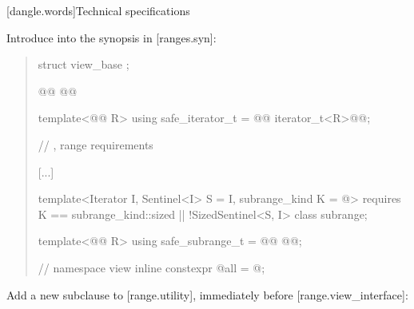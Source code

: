 [dangle.words]{Technical specifications}

Introduce  into the  synopsis in
[ranges.syn]:
\begin{quote}
\begin{codeblock}
    struct view_base { };

    @@
    @@

    template<@@ R>
      using safe_iterator_t =
        @@ iterator_t<R>@@;

    // , range requirements

    [...]

    template<Iterator I, Sentinel<I> S = I, subrange_kind K = @\seebelownc@>
      requires K == subrange_kind::sized || !SizedSentinel<S, I>
    class subrange;

    template<@@ R>
      using safe_subrange_t = @@
        @@;

    // 
    namespace view { inline constexpr @\unspec@ all = @\unspecnc@; }
\end{codeblock}
\end{quote}

Add a new subclause to [range.utility], immediately before [range.view_interface]:

